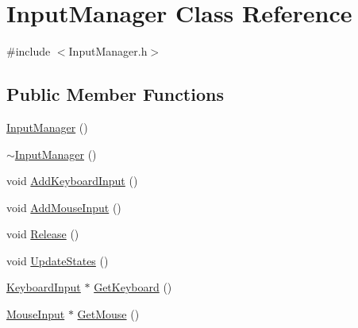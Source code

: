 \hypertarget{class_input_manager}{\section{Input\-Manager Class Reference}
\label{class_input_manager}
}


{\ttfamily \#include $<$Input\-Manager.\-h$>$}

\subsection*{Public Member Functions}
\begin{DoxyCompactItemize}
\item 
\hyperlink{class_input_manager_a8be46886da639b26d67181c29dab6d6c}{Input\-Manager} ()
\item 
\hyperlink{class_input_manager_af518290877dd183606709d5852db5491}{$\sim$\-Input\-Manager} ()
\item 
void \hyperlink{class_input_manager_ab3067ae0173779882fe90fc6a4ed8091}{Add\-Keyboard\-Input} ()
\item 
void \hyperlink{class_input_manager_a23e209e8a72132187eeb238a8b205dd4}{Add\-Mouse\-Input} ()
\item 
void \hyperlink{class_input_manager_a01789f6350560c18a10f01847a200d39}{Release} ()
\item 
void \hyperlink{class_input_manager_a0c1dc308a646b8fcdbdae7f9feea9287}{Update\-States} ()
\item 
\hyperlink{class_keyboard_input}{Keyboard\-Input} $\ast$ \hyperlink{class_input_manager_a6207e9e1fe4ae693262d33d2dd302635}{Get\-Keyboard} ()
\item 
\hyperlink{class_mouse_input}{Mouse\-Input} $\ast$ \hyperlink{class_input_manager_a0b5d413555ee81e05f74c7eb21ad50d3}{Get\-Mouse} ()
\end{DoxyCompactItemize}


